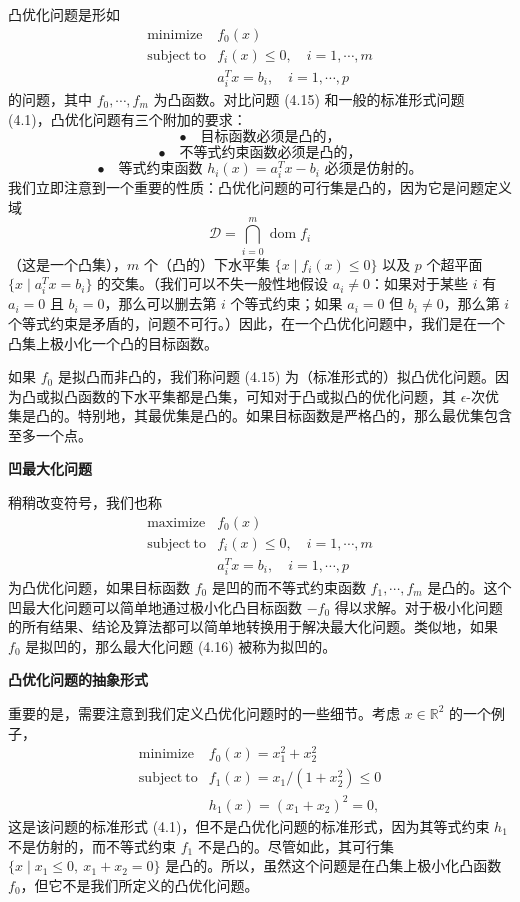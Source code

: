 \documentclass[UTF8, 12pt, fontset=fandol, oneside]{ctexart}
\begin{document}
凸优化问题是形如
\begin{equation}
\begin{array}{ll}
\mathop{\mathrm{minimize}} & f_0(x)\\
\mathrm{subject\ to} & f_i(x)\leq 0,\quad i=1,\cdots,m\\
& a_i^Tx=b_i,\quad i=1,\cdots,p
\end{array}
\tag{4.15}
\end{equation}
的问题，其中 $f_0,\cdots,f_m$ 为凸函数。对比问题 (4.15) 和一般的标准形式问题 (4.1)，凸优化问题有三个附加的要求：
\[
\bullet\quad \text{目标函数必须是凸的，}
\]
\[
\bullet\quad \text{不等式约束函数必须是凸的，}
\]
\[
\bullet\quad \text{等式约束函数 }h_i(x)=a_i^Tx-b_i\text{ 必须是仿射的。}
\]
我们立即注意到一个重要的性质：凸优化问题的可行集是凸的，因为它是问题定义域
\[
\mathcal{D}=\bigcap_{i=0}^{m}\operatorname{dom} f_i
\]
（这是一个凸集），$m$ 个（凸的）下水平集 $\{x\mid f_i(x)\leq 0\}$ 以及 $p$ 个超平面 $\{x\mid a_i^Tx=b_i\}$ 的交集。（我们可以不失一般性地假设 $a_i\neq 0$：如果对于某些 $i$ 有 $a_i=0$ 且 $b_i=0$，那么可以删去第 $i$ 个等式约束；如果 $a_i=0$ 但 $b_i\neq 0$，那么第 $i$ 个等式约束是矛盾的，问题不可行。）因此，在一个凸优化问题中，我们是在一个凸集上极小化一个凸的目标函数。

如果 $f_0$ 是拟凸而非凸的，我们称问题 (4.15) 为（标准形式的）拟凸优化问题。因为凸或拟凸函数的下水平集都是凸集，可知对于凸或拟凸的优化问题，其 $\epsilon$-次优集是凸的。特别地，其最优集是凸的。如果目标函数是严格凸的，那么最优集包含至多一个点。

\noindent\textbf{凹最大化问题}

稍稍改变符号，我们也称
\begin{equation}
\begin{array}{ll}
\mathop{\mathrm{maximize}} & f_0(x)\\
\mathrm{subject\ to} & f_i(x)\leq 0,\quad i=1,\cdots,m\\
& a_i^Tx=b_i,\quad i=1,\cdots,p
\end{array}
\tag{4.16}
\end{equation}
为凸优化问题，如果目标函数 $f_0$ 是凹的而不等式约束函数 $f_1,\cdots,f_m$ 是凸的。这个凹最大化问题可以简单地通过极小化凸目标函数 $-f_0$ 得以求解。对于极小化问题的所有结果、结论及算法都可以简单地转换用于解决最大化问题。类似地，如果 $f_0$ 是拟凹的，那么最大化问题 (4.16) 被称为拟凹的。

\noindent\textbf{凸优化问题的抽象形式}

重要的是，需要注意到我们定义凸优化问题时的一些细节。考虑 $x\in\mathbb{R}^2$ 的一个例子，
\begin{equation}
\begin{array}{ll}
\mathop{\mathrm{minimize}} & f_0(x)=x_1^2+x_2^2\\
\mathrm{subject\ to} & f_1(x)=x_1/(1+x_2^2)\leq 0\\
& h_1(x)=(x_1+x_2)^2=0,
\end{array}
\tag{4.17}
\end{equation}
这是该问题的标准形式 (4.1)，但不是凸优化问题的标准形式，因为其等式约束 $h_1$ 不是仿射的，而不等式约束 $f_1$ 不是凸的。尽管如此，其可行集 $\{x\mid x_1\leq 0,\ x_1+x_2=0\}$ 是凸的。所以，虽然这个问题是在凸集上极小化凸函数 $f_0$，但它不是我们所定义的凸优化问题。
\end{document}
